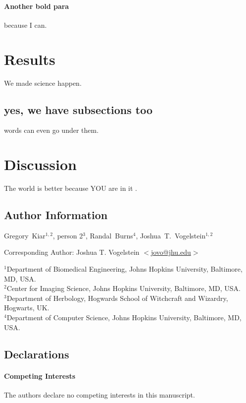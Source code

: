 \documentclass[12pt]{article}
\begin{document}
\paragraph{Another bold para}
because I can. \cite{ndmg}

\section{Results}

We made science happen.
 
\subsection{yes, we have subsections too}
words can even go under them.


\section{Discussion}

The world is better because YOU are in it \cite{openconnectome}.


\subsection*{Author Information}
{\normalsize Gregory~Kiar$^{1,2}$, person 2$^{3}$, Randal~Burns$^{4}$, Joshua~T.~Vogelstein$^{1,2}$ }

{\small \noindent Corresponding Author: Joshua T. Vogelstein $<$\url{jovo@jhu.edu}$>$}

\begin{spacing}{0.3}
{\normalsize \noindent${^1}$Department of Biomedical Engineering, Johns Hopkins University, Baltimore, MD, USA.\\
${^2}$Center for Imaging Science, Johns Hopkins University, Baltimore, MD, USA.\\
${^3}$Department of Herbology, Hogwards School of Witchcraft and Wizardry, Hogwarts, UK.\\
${^4}$Department of Computer Science, Johns Hopkins University, Baltimore, MD, USA.}
\end{spacing}

\subsection*{Declarations}
\paragraph{Competing Interests} The authors declare no competing interests in this manuscript.
\end{document}
